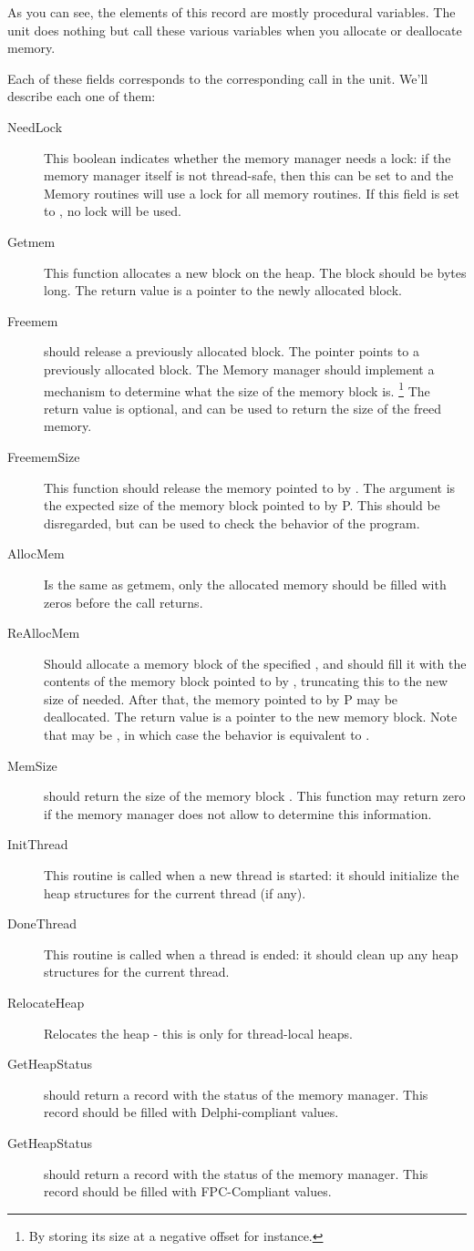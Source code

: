 As you can see, the elements of this record are mostly procedural variables.
The  unit does nothing but call these various variables when you
allocate or deallocate memory.

Each of these fields corresponds to the corresponding call in the 
unit. We'll describe each one of them:
\begin{description}
\item[NeedLock] This boolean indicates whether the memory manager needs a lock:
if the memory manager itself is not thread-safe, then this can be set to
 and the Memory routines will use a lock for all memory routines. 
If this field is set to , no lock will be used.
\item[Getmem] This function allocates a new block on the heap. The block
should be  bytes long. The return value is a pointer to the newly
allocated block.
\item[Freemem] should release a previously allocated block. The pointer
 points to a previously allocated block. The Memory manager should
implement a mechanism to determine what the size of the memory block is.
\footnote{By storing its size at a negative offset for instance.} The
return value is optional, and can be used to return the size of the freed
memory.
\item[FreememSize] This function should release the memory pointed to by
. The argument  is the expected size of the memory block
pointed to by P. This should be disregarded, but can be used to check the
behavior of the program.
\item[AllocMem] Is the same as getmem, only the allocated memory should
be filled with zeros before the call returns.
\item[ReAllocMem] Should allocate a memory block of the specified ,
and should fill it with the contents of the memory block pointed to by
, truncating this to the new size of needed. After that, the memory
pointed to by P may be deallocated. The return value is a pointer to the
new memory block. Note that  may be , in which case the
behavior is equivalent to .
\item[MemSize] should return the size of the memory block .
This function may return zero if the memory manager does not allow 
to determine this information.
\item[InitThread] This routine is called when a new thread is started:
it should initialize the heap structures for the current thread (if any).
\item[DoneThread] This routine is called when a thread is ended:
it should clean up any heap structures for the current thread.
\item[RelocateHeap] Relocates the heap - this is only for thread-local
heaps.
\item[GetHeapStatus] should return a  record with the
status of the memory manager. This record should be filled with
Delphi-compliant values.
\item[GetHeapStatus] should return a  record with the
status of the memory manager. This record should be filled with
FPC-Compliant values.
\end{description}
